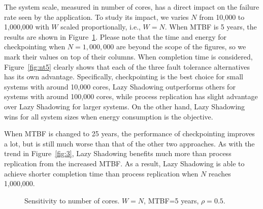 The system scale, measured in number of cores, has a direct impact on the failure rate seen by the application. To study its impact, we varies $N$ from 10,000 to 1,000,000 with $W$ scaled proportionally, i.e., $W=N$. When MTBF is 5 years, the results are shown in Figure~\ref{fig:n5}. Please note that the time and energy for checkpointing when $N=1,000,000$ are beyond the scope of the figures, so we mark their values on top of their columns. When completion time is considered, Figure~\ref{fig:nt5} clearly shows that each of the three fault tolerance alternatives has its own advantage. Specifically, checkpointing is the best choice for small systems with around 10,000 cores, Lazy Shadowing outperforms others for systems with around 100,000 cores, while process replication has slight advantage over Lazy Shadowing for larger systems. On the other hand, Lazy Shadowing wins for all system sizes when energy consumption is the objective. 

When MTBF is changed to 25 years, the performance of checkpointing improves a lot, but is still much worse than that of the other two approaches. As with the trend in Figure~\ref{fig:3}, Lazy Shadowing benefits much more than process replication from the increased MTBF. As a result, Lazy Shadowing is able to achieve shorter completion time than process replication when $N$ reaches 1,000,000.

\begin{figure}[!t]
	\begin{center}
	\end{center}
	\caption{Sensitivity to number of cores. $W=N$, MTBF=5 years, $\rho=0.5$.}
	\label{fig:n5}
\end{figure}

